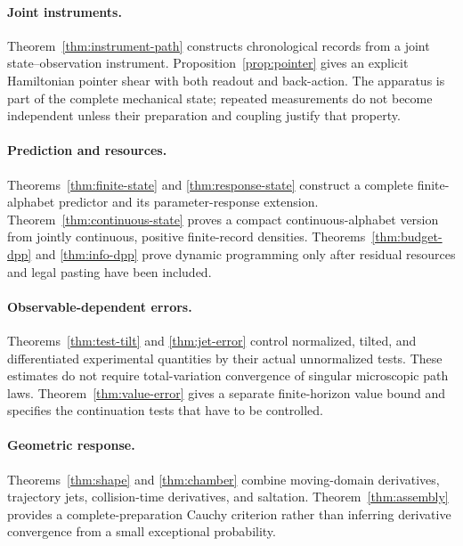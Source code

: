 \paragraph{Joint instruments.}
Theorem~\ref{thm:instrument-path} constructs chronological records from a joint state--observation instrument. Proposition~\ref{prop:pointer} gives an explicit Hamiltonian pointer shear with both readout and back-action. The apparatus is part of the complete mechanical state; repeated measurements do not become independent unless their preparation and coupling justify that property.

\paragraph{Prediction and resources.}
Theorems~\ref{thm:finite-state} and \ref{thm:response-state} construct a complete finite-alphabet predictor and its parameter-response extension. Theorem~\ref{thm:continuous-state} proves a compact continuous-alphabet version from jointly continuous, positive finite-record densities. Theorems~\ref{thm:budget-dpp} and \ref{thm:info-dpp} prove dynamic programming only after residual resources and legal pasting have been included.

\paragraph{Observable-dependent errors.}
Theorems~\ref{thm:test-tilt} and \ref{thm:jet-error} control normalized, tilted, and differentiated experimental quantities by their actual unnormalized tests. These estimates do not require total-variation convergence of singular microscopic path laws. Theorem~\ref{thm:value-error} gives a separate finite-horizon value bound and specifies the continuation tests that have to be controlled.

\paragraph{Geometric response.}
Theorems~\ref{thm:shape} and \ref{thm:chamber} combine moving-domain derivatives, trajectory jets, collision-time derivatives, and saltation. Theorem~\ref{thm:assembly} provides a complete-preparation Cauchy criterion rather than inferring derivative convergence from a small exceptional probability.

